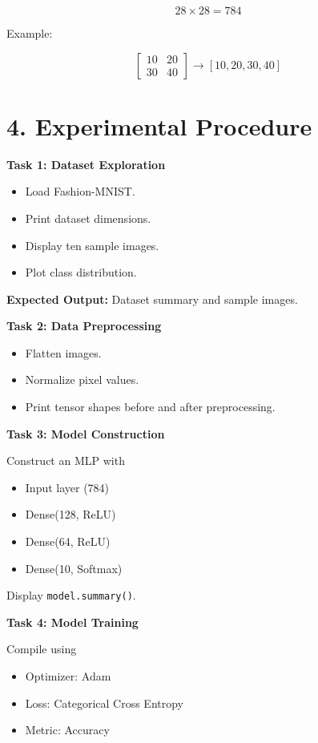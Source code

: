 \documentclass[11pt]{article}
\begin{document}
\[
28\times28=784
\]

Example:

\[
\begin{bmatrix}
10&20\\30&40
\end{bmatrix}
\rightarrow
[10,20,30,40]
\]


\section*{4. Experimental Procedure}

\textbf{Task 1: Dataset Exploration}
\begin{itemize}
\item Load Fashion-MNIST.
\item Print dataset dimensions.
\item Display ten sample images.
\item Plot class distribution.
\end{itemize}

\textbf{Expected Output:}
Dataset summary and sample images.

\bigskip

\textbf{Task 2: Data Preprocessing}

\begin{itemize}
\item Flatten images.
\item Normalize pixel values.
\item Print tensor shapes before and after preprocessing.
\end{itemize}

\bigskip

\textbf{Task 3: Model Construction}

Construct an MLP with

\begin{itemize}
\item Input layer (784)
\item Dense(128, ReLU)
\item Dense(64, ReLU)
\item Dense(10, Softmax)
\end{itemize}

Display \texttt{model.summary()}.

\bigskip

\textbf{Task 4: Model Training}

Compile using

\begin{itemize}
\item Optimizer: Adam
\item Loss: Categorical Cross Entropy
\item Metric: Accuracy
\end{itemize}
\end{document}
